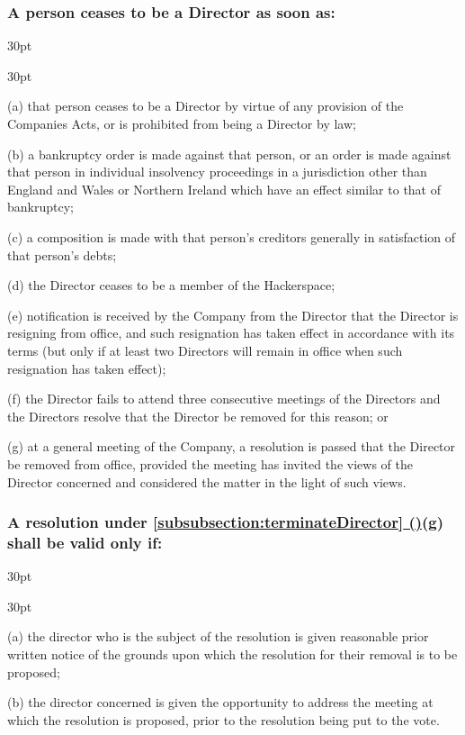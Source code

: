 \documentclass[12pt]{article}
\newcommand*{\fancyref}[1]{\hyperref[{#1}]{\autoref*{#1} (\nameref*{#1})}}
\def\clauseindent{30pt}
\newenvironment{subindentlist}{\begin{adjustwidth}{\clauseindent}{}\begin{labeledlist}{\clauseindent}}{\end{labeledlist}\end{adjustwidth}}
\begin{document}
\subsubsection[Automatic termination of Directors]{\label{subsubsection:terminateDirector}A person ceases to be a Director as soon as:}
\begin{subindentlist}
    \item [(a)] that person ceases to be a Director by virtue of any provision of the Companies Acts, or is prohibited from being a Director by law;
    \item [(b)] a bankruptcy order is made against that person, or an order is made against that person in individual insolvency proceedings in a jurisdiction other than England and Wales or Northern Ireland which have an effect similar to that of bankruptcy;
    \item [(c)] a composition is made with that person's creditors generally in satisfaction of that person's debts;
    \item [(d)] the Director ceases to be a member of the Hackerspace;
    \item [(e)] notification is received by the Company from the Director that the Director is resigning from office, and such resignation has taken effect in accordance with its terms (but only if at least two Directors will remain in office when such resignation has taken effect);
    \item [(f)] the Director fails to attend three consecutive meetings of the Directors and the Directors resolve that the Director be removed for this reason; or
    \item [(g)] at a general meeting of the Company, a resolution is passed that the Director be removed from office, provided the meeting has invited the views of the Director concerned and considered the matter in the light of such views.
\end{subindentlist}
\subsubsection{A resolution under \fancyref{subsubsection:terminateDirector}(g) shall be valid only if:}
\begin{subindentlist}
    \item [(a)] the director who is the subject of the resolution is given reasonable prior written notice of the grounds upon which the resolution for their removal is to be proposed;
    \item [(b)] the director concerned is given the opportunity to address the meeting at which the resolution is proposed, prior to the resolution being put to the vote.
\end{subindentlist}
\end{document}
